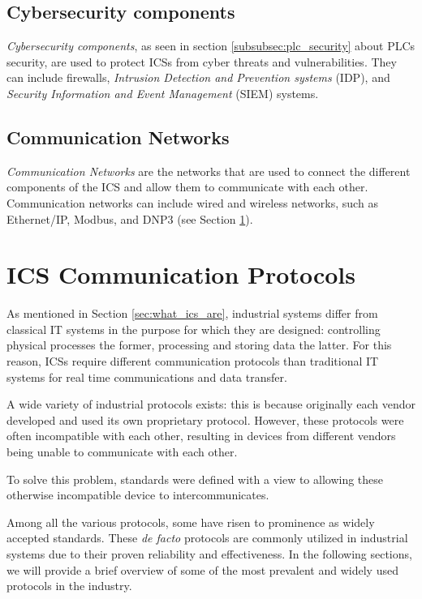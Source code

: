 \subsection{Cybersecurity components}
\textit{Cybersecurity components}, as seen in section \ref{subsubsec:plc_security} about PLCs security, are used to protect  ICSs from cyber threats and vulnerabilities. They can include firewalls, \textit{Intrusion Detection and Prevention systems} (IDP), and \textit{Security Information and Event Management} (SIEM) systems.

\subsection{Communication Networks}
\textit{Communication Networks} are the networks that are used to connect the different components of the ICS and allow them to communicate with each other. Communication networks can include wired and wireless networks, such as Ethernet/IP, Modbus, and DNP3 (see Section \ref{sec:ics_protocols}).

\section{ICS Communication Protocols}
\label{sec:ics_protocols}
As mentioned in Section \ref{sec:what_ics_are}, industrial systems differ from classical IT systems in the purpose for which they are designed: controlling physical processes the former, processing and storing data the latter. For this reason, ICSs require different communication protocols than traditional IT systems for real time communications and data transfer.

\bigskip
A wide variety of industrial protocols exists: this is because originally each vendor developed and used its own proprietary protocol. However, these protocols were often incompatible with each other, resulting in devices from different vendors being unable to communicate with each other.

To solve this problem, standards were defined with a view to allowing these otherwise incompatible device to intercommunicates.

\bigskip
Among all the various protocols, some have risen to prominence as widely accepted standards. These \textit{de facto} protocols are commonly utilized in industrial systems due to their proven reliability and effectiveness. In the following sections, we will provide a brief overview of some of the most prevalent and widely used protocols in the industry.

